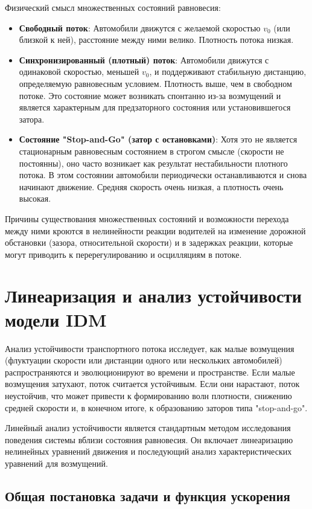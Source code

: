 \documentclass[12pt, a4paper]{article}
\begin{document}
Физический смысл множественных состояний равновесия:
\begin{itemize}
    \item \textbf{Свободный поток}: Автомобили движутся с желаемой скоростью $v_0$ (или близкой к ней), расстояние между ними велико. Плотность потока низкая.
    \item \textbf{Синхронизированный (плотный) поток}: Автомобили движутся с одинаковой скоростью, меньшей $v_0$, и поддерживают стабильную дистанцию, определяемую равновесным условием. Плотность выше, чем в свободном потоке. Это состояние может возникать спонтанно из-за возмущений и является характерным для предзаторного состояния или установившегося затора.
    \item \textbf{Состояние "Stop-and-Go" (затор с остановками)}: Хотя это не является стационарным равновесным состоянием в строгом смысле (скорости не постоянны), оно часто возникает как результат нестабильности плотного потока. В этом состоянии автомобили периодически останавливаются и снова начинают движение. Средняя скорость очень низкая, а плотность очень высокая.
\end{itemize}
Причины существования множественных состояний и возможности перехода между ними кроются в нелинейности реакции водителей на изменение дорожной обстановки (зазора, относительной скорости) и в задержках реакции, которые могут приводить к перерегулированию и осцилляциям в потоке.

\section{Линеаризация и анализ устойчивости модели IDM}
\label{sec:linearization_stability}

Анализ устойчивости транспортного потока исследует, как малые возмущения (флуктуации скорости или дистанции одного или нескольких автомобилей) распространяются и эволюционируют во времени и пространстве. Если малые возмущения затухают, поток считается устойчивым. Если они нарастают, поток неустойчив, что может привести к формированию волн плотности, снижению средней скорости и, в конечном итоге, к образованию заторов типа "stop-and-go".

Линейный анализ устойчивости является стандартным методом исследования поведения системы вблизи состояния равновесия. Он включает линеаризацию нелинейных уравнений движения и последующий анализ характеристических уравнений для возмущений.

\subsection{Общая постановка задачи и функция ускорения}
\label{subsec:linearization_setup}
\end{document}
